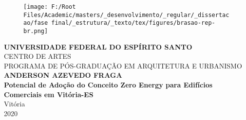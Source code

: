 \documentclass[a4paper, 12pt]{article}
\begin{document}
\begin{titlepage}
    \begin{center}
        \begin{figure}
            \centering
            \texttt{[image: F:/Root Files/Academic/masters/\_desenvolvimento/\_regular/\_dissertacao/fase final/\_estrutura/\_texto/tex/figures/brasao-rep-br.png]}
        \end{figure}
        \vspace*{0.1cm}
        \textbf \uppercase{{\large Universidade Federal do Espírito Santo}}\\
        \uppercase {\large Centro de Artes}\\
        \uppercase {\large Programa de Pós-Graduação em Arquitetura e Urbanismo}\\
        \vspace*{3cm}
        \textbf \uppercase{{\large Anderson Azevedo Fraga}}\\
        \vspace{4cm}
        \textbf{Potencial de Adoção do Conceito Zero Energy para Edifícios Comerciais em Vitória-ES}\\
        \vfill %
        Vitória\\
        2020

    \end{center}
\end{titlepage}


\thispagestyle{empty} %
\pagebreak



\listoffigures\pagebreak
\listoftables\pagebreak
\tableofcontents\pagebreak









%
\printbibliography
\end{document}
